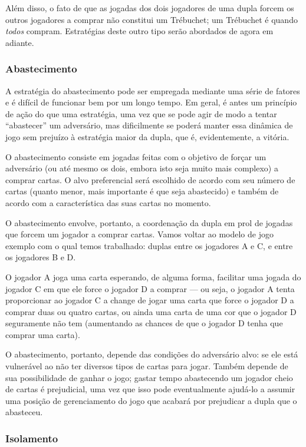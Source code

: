 Além disso, o fato de que as jogadas dos dois jogadores de uma dupla forcem os outros jogadores a comprar não constitui um Trébuchet; um Trébuchet é quando \emph{todos} compram. Estratégias deste outro tipo serão abordados de agora em adiante.

\subsubsection{Abastecimento}

A estratégia do abastecimento pode ser empregada mediante uma série de fatores e é difícil de funcionar bem por um longo tempo. Em geral, é antes um princípio de ação do que uma estratégia, uma vez que se pode agir de modo a tentar ``abastecer'' um adversário, mas dificilmente se poderá manter essa dinâmica de jogo sem prejuízo à estratégia maior da dupla, que é, evidentemente, a vitória.

O abastecimento consiste em jogadas feitas com o objetivo de forçar um adversário (ou até mesmo os dois, embora isto seja muito mais complexo) a comprar cartas. O alvo preferencial será escolhido de acordo com seu número de cartas (quanto menor, mais importante é que seja abastecido) e também de acordo com a característica das suas cartas no momento.

O abastecimento envolve, portanto, a coordenação da dupla em prol de jogadas que forcem um jogador a comprar cartas. Vamos voltar ao modelo de jogo exemplo com o qual temos trabalhado: duplas entre os jogadores A e C, e entre os jogadores B e D.

O jogador A joga uma carta esperando, de alguma forma, facilitar uma jogada do jogador C em que ele force o jogador D a comprar --- ou seja, o jogador A tenta proporcionar ao jogador C a change de jogar uma carta que force o jogador D a comprar duas ou quatro cartas, ou ainda uma carta de uma cor que o jogador D seguramente não tem (aumentando as chances de que o jogador D tenha que comprar uma carta).

O abastecimento, portanto, depende das condições do adversário alvo: se ele está vulnerável ao não ter diversos tipos de cartas para jogar. Também depende de sua possibilidade de ganhar o jogo; gastar tempo abastecendo um jogador cheio de cartas é prejudicial, uma vez que isso pode eventualmente ajudá-lo a assumir uma posição de gerenciamento do jogo que acabará por prejudicar a dupla que o abasteceu.

\subsubsection{Isolamento}

